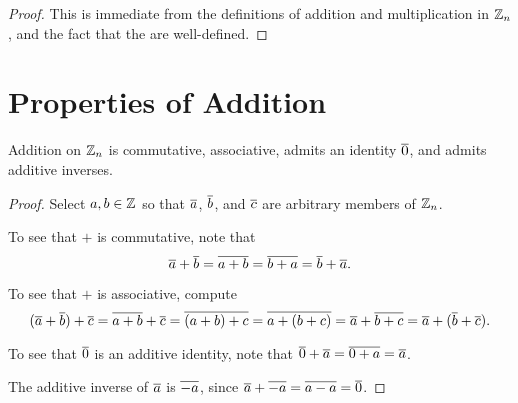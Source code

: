 \documentclass{amsart}
\begin{document}
\begin{proof}
This is immediate from the definitions of addition and multiplication in $\mathbb{Z}_n$,
and the fact that the are well-defined.
\end{proof}

\newpage

\section{Properties of Addition}

\begin{Prop}
Addition on $\mathbb{Z}_{n}$ is commutative, associative, admits an identity $\overline{0}$,
and admits additive inverses.
\end{Prop}

\begin{proof}
Select $a,b \in \mathbb{Z}$ so that $\overline{a}$, $\overline{b}$, and $\overline{c}$
are arbitrary members of $\mathbb{Z}_{n}$.

To see that $+$ is commutative, note that
\[ \overline{a} + \overline{b} = \overline{a+b} = \overline{b+a} = \overline{b} + \overline{a} . \]

To see that $+$ is associative, compute
\[ (\overline{a}+\overline{b}) + \overline{c} = \overline{a+b} + \overline{c} = \overline{(a+b)+c} = \overline{a+(b+c)} = \overline{a} + \overline{b+c}
    = \overline{a} + (\overline{b} + \overline{c}) . \]


To see that $\overline{0}$ is an additive identity, note that
$\overline{0} + \overline{a} = \overline{0+a} = \overline{a}$.

The additive inverse of $\overline{a}$ is $\overline{-a}$, since
$\overline{a} + \overline{-a} = \overline{a-a} = \overline{0}$.
\end{proof}
\end{document}
